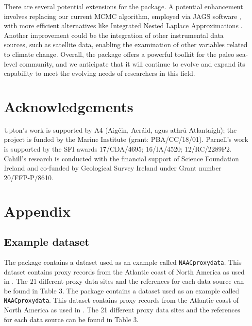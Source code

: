 There are several potential extensions for the  package. A potential enhancement involves replacing our current MCMC algorithm, employed via JAGS software \citep{plummer2003jags}, with more efficient alternatives like Integrated Nested Laplace Approximations \citep[INLA:][]{rue2009approximate}. Another improvement could be the integration of other instrumental data sources, such as satellite data, enabling the examination of other variables related to climate change. Overall, the  package offers a powerful toolkit for the paleo sea-level community, and we anticipate that it will continue to evolve and expand its capability to meet the evolving needs of researchers in this field.

\section{Acknowledgements}\label{acknowledgements}

Upton's work is supported by A4 (Aigéin, Aeráid, agus athrú Atlantaigh); the project is funded by the Marine Institute (grant: PBA/CC/18/01). Parnell's work is supported by the SFI awards 17/CDA/4695; 16/IA/4520; 12/RC/2289P2. Cahill's research is conducted with the financial support of Science Foundation Ireland and co-funded by Geological Survey Ireland under Grant number 20/FFP-P/8610.

\section{Appendix}\label{appendix}

\subsection{Example dataset}\label{exampledatasetappendix}

The  package contains a dataset used as an example called \texttt{NAACproxydata}. This dataset contains proxy records from the Atlantic coast of North America as used in \citet{Upton2023noisy}. The 21 different proxy data sites and the references for each data source can be found in Table 3. The  package contains a dataset used as an example called \texttt{NAACproxydata}. This dataset contains proxy records from the Atlantic coast of North America as used in \citet{Upton2023noisy}. The 21 different proxy data sites and the references for each data source can be found in Table 3.

